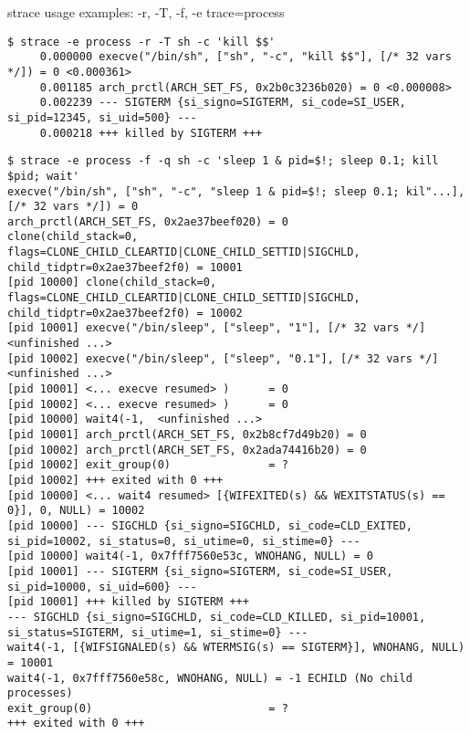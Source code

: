 \documentclass[unicode]{beamer}
\begin{document}
\begin{frame}[fragile]{strace usage examples: -r, -T, -f, -e trace=process}
\Tiny
\begin{verbatim}
$ strace -e process -r -T sh -c 'kill $$'
     0.000000 execve("/bin/sh", ["sh", "-c", "kill $$"], [/* 32 vars */]) = 0 <0.000361>
     0.001185 arch_prctl(ARCH_SET_FS, 0x2b0c3236b020) = 0 <0.000008>
     0.002239 --- SIGTERM {si_signo=SIGTERM, si_code=SI_USER, si_pid=12345, si_uid=500} ---
     0.000218 +++ killed by SIGTERM +++
\end{verbatim}

\begin{verbatim}
$ strace -e process -f -q sh -c 'sleep 1 & pid=$!; sleep 0.1; kill $pid; wait'
execve("/bin/sh", ["sh", "-c", "sleep 1 & pid=$!; sleep 0.1; kil"...], [/* 32 vars */]) = 0
arch_prctl(ARCH_SET_FS, 0x2ae37beef020) = 0
clone(child_stack=0, flags=CLONE_CHILD_CLEARTID|CLONE_CHILD_SETTID|SIGCHLD, child_tidptr=0x2ae37beef2f0) = 10001
[pid 10000] clone(child_stack=0, flags=CLONE_CHILD_CLEARTID|CLONE_CHILD_SETTID|SIGCHLD, child_tidptr=0x2ae37beef2f0) = 10002
[pid 10001] execve("/bin/sleep", ["sleep", "1"], [/* 32 vars */] <unfinished ...>
[pid 10002] execve("/bin/sleep", ["sleep", "0.1"], [/* 32 vars */] <unfinished ...>
[pid 10001] <... execve resumed> )      = 0
[pid 10002] <... execve resumed> )      = 0
[pid 10000] wait4(-1,  <unfinished ...>
[pid 10001] arch_prctl(ARCH_SET_FS, 0x2b8cf7d49b20) = 0
[pid 10002] arch_prctl(ARCH_SET_FS, 0x2ada74416b20) = 0
[pid 10002] exit_group(0)               = ?
[pid 10002] +++ exited with 0 +++
[pid 10000] <... wait4 resumed> [{WIFEXITED(s) && WEXITSTATUS(s) == 0}], 0, NULL) = 10002
[pid 10000] --- SIGCHLD {si_signo=SIGCHLD, si_code=CLD_EXITED, si_pid=10002, si_status=0, si_utime=0, si_stime=0} ---
[pid 10000] wait4(-1, 0x7fff7560e53c, WNOHANG, NULL) = 0
[pid 10001] --- SIGTERM {si_signo=SIGTERM, si_code=SI_USER, si_pid=10000, si_uid=600} ---
[pid 10001] +++ killed by SIGTERM +++
--- SIGCHLD {si_signo=SIGCHLD, si_code=CLD_KILLED, si_pid=10001, si_status=SIGTERM, si_utime=1, si_stime=0} ---
wait4(-1, [{WIFSIGNALED(s) && WTERMSIG(s) == SIGTERM}], WNOHANG, NULL) = 10001
wait4(-1, 0x7fff7560e58c, WNOHANG, NULL) = -1 ECHILD (No child processes)
exit_group(0)                           = ?
+++ exited with 0 +++
\end{verbatim}
\end{frame}
\end{document}
